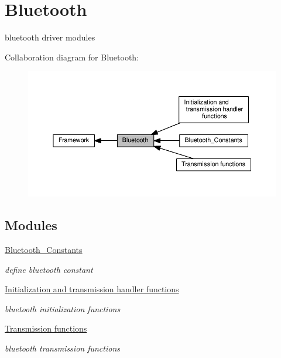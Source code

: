 \hypertarget{group__bluetooth}{}\section{Bluetooth}
\label{group__bluetooth}


bluetooth driver modules  


Collaboration diagram for Bluetooth\+:\nopagebreak
\begin{figure}[H]
\begin{center}
\leavevmode
\includegraphics[width=350pt]{d3/ddb/group__bluetooth}
\end{center}
\end{figure}
\subsection*{Modules}
\begin{DoxyCompactItemize}
\item 
\hyperlink{group__bluetooth___constants}{Bluetooth\+\_\+\+Constants}
\begin{DoxyCompactList}\small\item\em define bluetooth constant \end{DoxyCompactList}\item 
\hyperlink{group__bluetooth___init}{Initialization and transmission handler functions}
\begin{DoxyCompactList}\small\item\em bluetooth initialization functions \end{DoxyCompactList}\item 
\hyperlink{group__bluetooth___trans}{Transmission functions}
\begin{DoxyCompactList}\small\item\em bluetooth transmission functions \end{DoxyCompactList}\end{DoxyCompactItemize}
